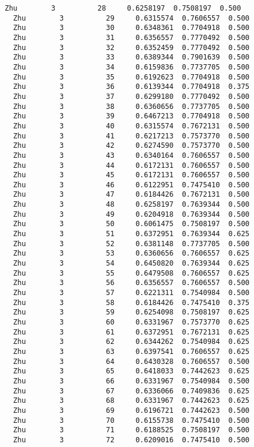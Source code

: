 \documentclass[11pt]{article}
\begin{document}
\begin{Verbatim}[commandchars=\\\{\}]
  Zhu        3          28     0.6258197  0.7508197  0.500
  Zhu        3          29     0.6315574  0.7606557  0.500
  Zhu        3          30     0.6348361  0.7704918  0.500
  Zhu        3          31     0.6356557  0.7770492  0.500
  Zhu        3          32     0.6352459  0.7770492  0.500
  Zhu        3          33     0.6389344  0.7901639  0.500
  Zhu        3          34     0.6159836  0.7737705  0.500
  Zhu        3          35     0.6192623  0.7704918  0.500
  Zhu        3          36     0.6139344  0.7704918  0.375
  Zhu        3          37     0.6299180  0.7770492  0.500
  Zhu        3          38     0.6360656  0.7737705  0.500
  Zhu        3          39     0.6467213  0.7704918  0.500
  Zhu        3          40     0.6315574  0.7672131  0.500
  Zhu        3          41     0.6217213  0.7573770  0.500
  Zhu        3          42     0.6274590  0.7573770  0.500
  Zhu        3          43     0.6340164  0.7606557  0.500
  Zhu        3          44     0.6172131  0.7606557  0.500
  Zhu        3          45     0.6172131  0.7606557  0.500
  Zhu        3          46     0.6122951  0.7475410  0.500
  Zhu        3          47     0.6184426  0.7672131  0.500
  Zhu        3          48     0.6258197  0.7639344  0.500
  Zhu        3          49     0.6204918  0.7639344  0.500
  Zhu        3          50     0.6061475  0.7508197  0.500
  Zhu        3          51     0.6372951  0.7639344  0.625
  Zhu        3          52     0.6381148  0.7737705  0.500
  Zhu        3          53     0.6360656  0.7606557  0.625
  Zhu        3          54     0.6450820  0.7639344  0.625
  Zhu        3          55     0.6479508  0.7606557  0.625
  Zhu        3          56     0.6356557  0.7606557  0.500
  Zhu        3          57     0.6221311  0.7540984  0.500
  Zhu        3          58     0.6184426  0.7475410  0.375
  Zhu        3          59     0.6254098  0.7508197  0.625
  Zhu        3          60     0.6331967  0.7573770  0.625
  Zhu        3          61     0.6372951  0.7672131  0.625
  Zhu        3          62     0.6344262  0.7540984  0.625
  Zhu        3          63     0.6397541  0.7606557  0.625
  Zhu        3          64     0.6430328  0.7606557  0.500
  Zhu        3          65     0.6418033  0.7442623  0.625
  Zhu        3          66     0.6331967  0.7540984  0.500
  Zhu        3          67     0.6336066  0.7409836  0.625
  Zhu        3          68     0.6331967  0.7442623  0.625
  Zhu        3          69     0.6196721  0.7442623  0.500
  Zhu        3          70     0.6155738  0.7475410  0.500
  Zhu        3          71     0.6188525  0.7508197  0.500
  Zhu        3          72     0.6209016  0.7475410  0.500

\end{Verbatim}
\end{document}
